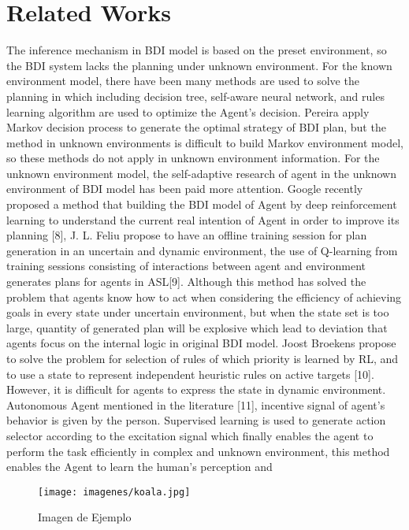 \documentclass{article}
\begin{document}
\section{Related Works}
\label{introduccion}
The inference mechanism in BDI model is based on the preset
environment, so the BDI system lacks the planning under
unknown environment. For the known environment model, there
have been many methods are used to solve the planning in which
including decision tree, self-aware neural network, and rules
learning algorithm are used to optimize the Agent’s decision.
Pereira apply Markov decision process to generate the optimal
strategy of BDI plan, but the method in unknown environments is
difficult to build Markov environment model, so these methods do
not apply in unknown environment information.
For the unknown environment model, the self-adaptive research
of agent in the unknown environment of BDI model has been paid
more attention. Google recently proposed a method that building
the BDI model of Agent by deep reinforcement learning to
understand the current real intention of Agent in order to improve
its planning [8], J. L. Feliu propose to have an offline training
session for plan generation in an uncertain and dynamic
environment, the use of Q-learning from training sessions
consisting of interactions between agent and environment
generates plans for agents in ASL[9]. Although this method has
solved the problem that agents know how to act when considering
the efficiency of achieving goals in every state under uncertain
environment, but when the state set is too large, quantity of
generated plan will be explosive which lead to deviation that
agents focus on the internal logic in original BDI model. Joost
Broekens propose to solve the problem for selection of rules of
which priority is learned by RL, and to use a state to represent
independent heuristic rules on active targets [10]. However, it is
difficult for agents to express the state in dynamic environment.
Autonomous Agent mentioned in the literature [11], incentive
signal of agent's behavior is given by the person. Supervised
learning is used to generate action selector according to the
excitation signal which finally enables the agent to perform the
task efficiently in complex and unknown environment, this
method enables the Agent to learn the human’s perception and 

\begin{figure}[h]
\centering
\texttt{[image: imagenes/koala.jpg]}
\caption{Imagen de Ejemplo}
\label{figura1}
\end{figure}
\end{document}
